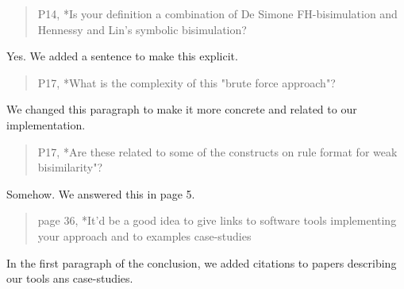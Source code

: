 \documentclass[10pt]{article}
\newenvironment{review}{\bgroup\itshape\begin{quote}}{\end{quote}\egroup}
\begin{document}
\begin{review}
P14, *Is your definition a combination of De Simone FH-bisimulation and Hennessy and Lin's symbolic bisimulation?
\end{review}
Yes. We added a sentence to make this explicit.


\begin{review}
{P17, *What is the complexity of this "brute force approach"?}
\end{review}
We changed this paragraph to make it more concrete and related to our implementation.

\begin{review}
{P17, *Are these related to some of the constructs on rule format for weak bisimilarity"?}
\end{review}
Somehow. We answered this in page 5.

\begin{review}
{page 36, *It'd be a good idea to give links to software tools implementing your approach and to examples case-studies}
\end{review}
In the first paragraph of the conclusion, we added citations to papers describing our tools ans case-studies.
\end{document}
